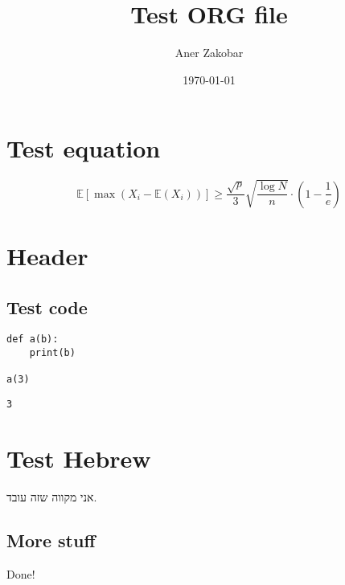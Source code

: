 \documentclass{article}
\author{Aner Zakobar}
\date{\today}
\title{Test ORG file}
\begin{document}
\maketitle
\tableofcontents


\section{Test equation}
\label{sec:org99ed951}

$$\mathbb{E}[\max(X_i - \mathbb{E}(X_i))] \geq \frac{\sqrt{p}}{3}\sqrt{\frac{\log N}{n}}\cdot\left(1 - \frac{1}{e}\right)$$

\section{Header}
\label{sec:orgc14cd1f}

\subsection{Test code}
\label{sec:orgb6381b8}

\begin{verbatim}
def a(b):
    print(b)

a(3)
\end{verbatim}

\begin{verbatim}
3
\end{verbatim}

\section{Test Hebrew}
\label{sec:org6df4d22}

\begin{hebrew}

אני מקווה שזה עובד.

\end{hebrew}

\subsection{More stuff}
\label{sec:org4700fe9}

Done!
\end{document}
